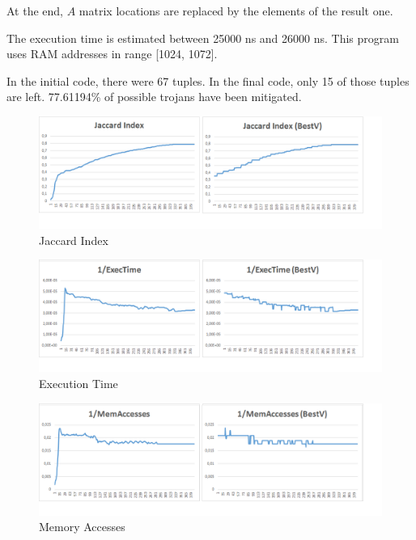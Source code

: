\documentclass[a4paper,twoside]{article}
\theoremstyle{definition}
\theoremstyle{remark}
\begin{document}
At the end, $A$ matrix locations are replaced by the elements of the result one.

The execution time is estimated between 25000 ns and 26000 ns. 
This program uses  RAM addresses in range [1024, 1072].
\newline

In the initial code, there were 67 tuples.
In the final code, only 15 of those tuples are left.
77.61194\% of possible trojans have been mitigated.

\newpage

\begin{figure}[H]
\includegraphics[scale=0.6]{Immagini/11}
\caption{Jaccard Index}
\end{figure}

\begin{figure}[H]
\raggedright
\includegraphics[scale=0.6]{Immagini/12}
\caption{Execution Time}
\end{figure}

\begin{figure}[H]
\raggedright
\includegraphics[scale=0.6]{Immagini/13}
\caption{Memory Accesses}
\end{figure}
\end{document}
